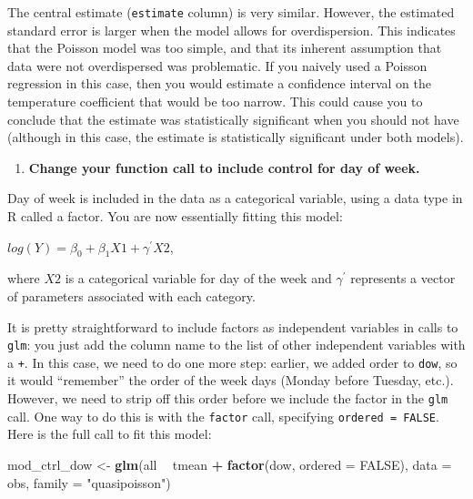 \documentclass[
]{book}
\newenvironment{Shaded}{\begin{snugshade}}{\end{snugshade}}
\newcommand{\DataTypeTok}[1]{\textcolor[rgb]{0.13,0.29,0.53}{#1}}
\newcommand{\KeywordTok}[1]{\textcolor[rgb]{0.13,0.29,0.53}{\textbf{#1}}}
\newcommand{\NormalTok}[1]{#1}
\newcommand{\OperatorTok}[1]{\textcolor[rgb]{0.81,0.36,0.00}{\textbf{#1}}}
\newcommand{\OtherTok}[1]{\textcolor[rgb]{0.56,0.35,0.01}{#1}}
\newcommand{\StringTok}[1]{\textcolor[rgb]{0.31,0.60,0.02}{#1}}
\providecommand{\tightlist}{%
  \setlength{\itemsep}{0pt}\setlength{\parskip}{0pt}}
\begin{document}
The central estimate (\texttt{estimate} column) is very similar. However, the estimated
standard error is larger when the model allows for overdispersion. This
indicates that the Poisson model was too simple, and that its inherent
assumption that data were not overdispersed was problematic. If you naively used
a Poisson regression in this case, then you would estimate a confidence
interval on the temperature coefficient that would be too narrow. This could
cause you to conclude that the estimate was statistically significant when
you should not have (although in this case, the estimate is statistically
significant under both models).

\begin{enumerate}
\def\labelenumi{\arabic{enumi}.}
\setcounter{enumi}{3}
\tightlist
\item
  \textbf{Change your function call to include control for day of week.}
\end{enumerate}

Day of week is included in the data as a categorical variable, using a
data type in R called a factor. You are now essentially fitting this model:

\(log(Y)=\beta_{0}+\beta_{1}X1+\gamma^{'}X2\),

where \(X2\) is a categorical variable for day of the week and \(\gamma^{'}\)
represents a vector of parameters associated with each category.

It is pretty straightforward to include factors as independent variables in calls
to \texttt{glm}: you just add the column name to the list of other independent variables
with a \texttt{+}. In this case, we need to do one more step: earlier, we added order to
\texttt{dow}, so it would ``remember'' the order of the week days (Monday before Tuesday,
etc.). However, we need to strip off this order before we include the factor in
the \texttt{glm} call. One way to do this is with the \texttt{factor} call, specifying
\texttt{ordered\ =\ FALSE}. Here is the full call to fit this model:

\begin{Shaded}
\begin{Highlighting}[]
\NormalTok{mod_ctrl_dow <-}\StringTok{ }\KeywordTok{glm}\NormalTok{(all }\OperatorTok{~}\StringTok{ }\NormalTok{tmean }\OperatorTok{+}\StringTok{ }\KeywordTok{factor}\NormalTok{(dow, }\DataTypeTok{ordered =} \OtherTok{FALSE}\NormalTok{), }
                    \DataTypeTok{data =}\NormalTok{ obs, }\DataTypeTok{family =} \StringTok{"quasipoisson"}\NormalTok{)}
\end{Highlighting}
\end{Shaded}
\end{document}
